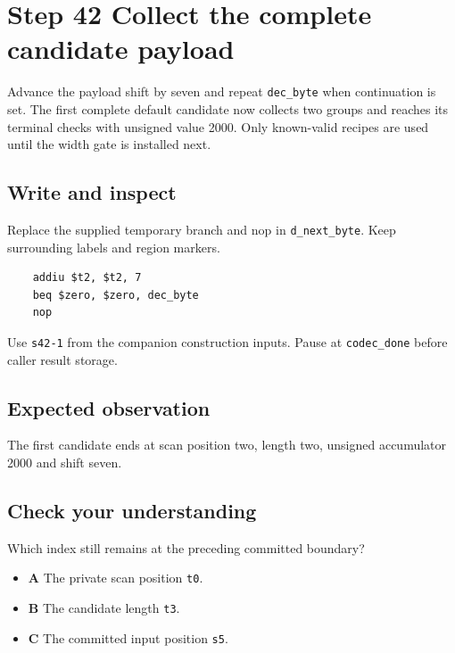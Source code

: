 \section{Step 42 Collect the complete candidate payload}\label{delta-s42}

Advance the payload shift by seven and repeat \texttt{dec\_byte} when continuation is set. The first complete default candidate now collects two groups and reaches its terminal checks with unsigned value 2000. Only known-valid recipes are used until the width gate is installed next.

\subsection{Write and inspect}
Replace the supplied temporary branch and nop in \texttt{d\_next\_byte}. Keep surrounding labels and region markers.

\begin{verbatim}
    addiu $t2, $t2, 7
    beq $zero, $zero, dec_byte
    nop
\end{verbatim}
Use \texttt{s42-1} from the companion construction inputs. Pause at \texttt{codec\_done} before caller result storage.

\subsection{Expected observation}
The first candidate ends at scan position two, length two, unsigned accumulator 2000 and shift seven.

\subsection{Check your understanding}
Which index still remains at the preceding committed boundary?

\begin{itemize}
  \item \textbf{A} The private scan position \texttt{t0}.
  \item \textbf{B} The candidate length \texttt{t3}.
  \item \textbf{C} The committed input position \texttt{s5}.
\end{itemize}
